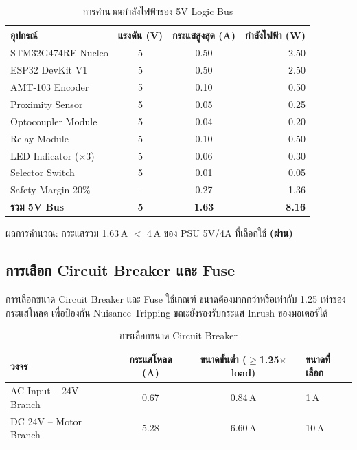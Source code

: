 \begin{table}[H]
  \centering
  \caption{การคำนวณกำลังไฟฟ้าของ 5V Logic Bus}
  \label{tab:power_5v}
  \begin{tabular}{lccr}
    \toprule
    อุปกรณ์ & แรงดัน (V) & กระแสสูงสุด (A) & กำลังไฟฟ้า (W) \\
    \midrule
    STM32G474RE Nucleo & 5 & 0.50 & 2.50 \\
    ESP32 DevKit V1    & 5 & 0.50 & 2.50 \\
    AMT-103 Encoder    & 5 & 0.10 & 0.50 \\
    Proximity Sensor   & 5 & 0.05 & 0.25 \\
    Optocoupler Module & 5 & 0.04 & 0.20 \\
    Relay Module       & 5 & 0.10 & 0.50 \\
    LED Indicator (×3) & 5 & 0.06 & 0.30 \\
    Selector Switch    & 5 & 0.01 & 0.05 \\
    \midrule
    Safety Margin 20\% & -- & 0.27 & 1.36 \\
    \midrule
    \textbf{รวม 5V Bus} & \textbf{5} & \textbf{1.63} & \textbf{8.16} \\
    \bottomrule
  \end{tabular}
\end{table}

ผลการคำนวณ: กระแสรวม 1.63\,A $<$ 4\,A ของ
PSU 5V/4A ที่เลือกใช้ \textbf{(ผ่าน)}

\subsection{การเลือก Circuit Breaker และ Fuse}
\label{subsec:breaker_fuse}

การเลือกขนาด Circuit Breaker และ Fuse ใช้เกณฑ์
ขนาดต้องมากกว่าหรือเท่ากับ 1.25 เท่าของกระแสโหลด
เพื่อป้องกัน Nuisance Tripping
ขณะยังรองรับกระแส Inrush ของมอเตอร์ได้

\begin{table}[H]
  \centering
  \caption{การเลือกขนาด Circuit Breaker}
  \label{tab:breaker_select}
  \begin{tabular}{lccl}
    \toprule
    วงจร & กระแสโหลด (A) & ขนาดขั้นต่ำ ($\geq$1.25$\times$load) & ขนาดที่เลือก \\
    \midrule
    AC Input -- 24V Branch & 0.67 & 0.84\,A & 1\,A \\
    DC 24V -- Motor Branch & 5.28 & 6.60\,A & 10\,A \\
    \bottomrule
  \end{tabular}
\end{table}

